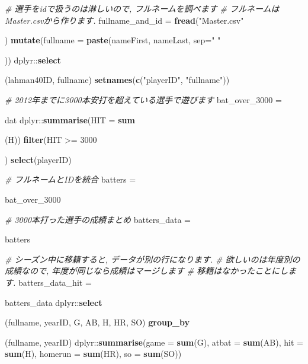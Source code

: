 \documentclass[]{article}
\newenvironment{Shaded}{}{}
\newcommand{\KeywordTok}[1]{\textcolor[rgb]{0.00,0.44,0.13}{\textbf{{#1}}}}
\newcommand{\DataTypeTok}[1]{\textcolor[rgb]{0.56,0.13,0.00}{{#1}}}
\newcommand{\DecValTok}[1]{\textcolor[rgb]{0.25,0.63,0.44}{{#1}}}
\newcommand{\StringTok}[1]{\textcolor[rgb]{0.25,0.44,0.63}{{#1}}}
\newcommand{\CommentTok}[1]{\textcolor[rgb]{0.38,0.63,0.69}{\textit{{#1}}}}
\newcommand{\NormalTok}[1]{{#1}}
\begin{document}
\begin{Shaded}
\begin{Highlighting}[]

\CommentTok{# 選手をidで扱うのは淋しいので, フルネームを調べます}
\CommentTok{# フルネームはMaster.csvから作ります.}
\NormalTok{fullname_and_id =}\StringTok{ }
\StringTok{  }\KeywordTok{fread}\NormalTok{(}\StringTok{"Master.csv"}\NormalTok{) %>%}\StringTok{ }
\StringTok{  }\KeywordTok{mutate}\NormalTok{(}\DataTypeTok{fullname =} \KeywordTok{paste}\NormalTok{(nameFirst, nameLast, }\DataTypeTok{sep=}\StringTok{" "}\NormalTok{)) %>%}\StringTok{ }
\StringTok{  }\NormalTok{dplyr::}\KeywordTok{select}\NormalTok{(lahman40ID, fullname) %>%}\StringTok{ }
\StringTok{  }\KeywordTok{setnames}\NormalTok{(}\KeywordTok{c}\NormalTok{(}\StringTok{"playerID"}\NormalTok{, }\StringTok{"fullname"}\NormalTok{))}

\CommentTok{# 2012年までに3000本安打を超えている選手で遊びます}
\NormalTok{bat_over_3000 =}\StringTok{ }
\StringTok{  }\NormalTok{dat %>%}\StringTok{ }\KeywordTok{group_by}\NormalTok{(playerID) %>%}\StringTok{ }
\StringTok{  }\NormalTok{dplyr::}\KeywordTok{summarise}\NormalTok{(}\DataTypeTok{HIT =} \KeywordTok{sum}\NormalTok{(H)) %>%}\StringTok{ }
\StringTok{  }\KeywordTok{filter}\NormalTok{(HIT >=}\StringTok{ }\DecValTok{3000}\NormalTok{) %>%}\StringTok{ }
\StringTok{  }\KeywordTok{select}\NormalTok{(playerID)}

\CommentTok{# フルネームとIDを統合}
\NormalTok{batters =}\StringTok{ }\NormalTok{bat_over_3000 %>%}\StringTok{ }\KeywordTok{inner_join}\NormalTok{(fullname_and_id, }\DataTypeTok{by=}\StringTok{"playerID"}\NormalTok{)}

\CommentTok{# 3000本打った選手の成績まとめ}
\NormalTok{batters_data =}\StringTok{ }\NormalTok{batters %>%}\StringTok{ }\KeywordTok{inner_join}\NormalTok{(dat, }\DataTypeTok{by =} \StringTok{"playerID"}\NormalTok{)}

\CommentTok{# シーズン中に移籍すると, データが別の行になります. }
\CommentTok{# 欲しいのは年度別の成績なので, 年度が同じなら成績はマージします}
\CommentTok{# 移籍はなかったことにします.}
\NormalTok{batters_data_hit =}\StringTok{ }
\StringTok{  }\NormalTok{batters_data %>%}
\StringTok{  }\NormalTok{dplyr::}\KeywordTok{select}\NormalTok{(fullname, yearID, G, AB, H, HR, SO) %>%}\StringTok{ }
\StringTok{  }\KeywordTok{group_by}\NormalTok{(fullname, yearID) %>%}
\StringTok{  }\NormalTok{dplyr::}\KeywordTok{summarise}\NormalTok{(}\DataTypeTok{game =} \KeywordTok{sum}\NormalTok{(G), }\DataTypeTok{atbat =} \KeywordTok{sum}\NormalTok{(AB), }\DataTypeTok{hit =} \KeywordTok{sum}\NormalTok{(H), }\DataTypeTok{homerun =} \KeywordTok{sum}\NormalTok{(HR), }\DataTypeTok{so =} \KeywordTok{sum}\NormalTok{(SO))}

}}}}}}}}}}}
\end{Highlighting}
\end{Shaded}
\end{document}
